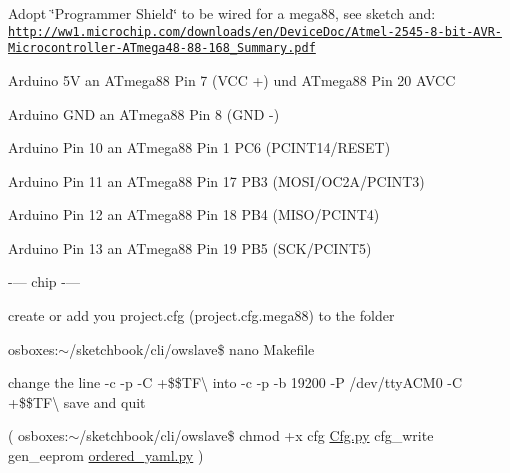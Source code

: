 Adopt \char`\"{}\-Programmer Shield\char`\"{} to be wired for a mega88, see sketch and\-: \href{http://ww1.microchip.com/downloads/en/DeviceDoc/Atmel-2545-8-bit-AVR-Microcontroller-ATmega48-88-168_Summary.pdf}{\tt http\-://ww1.\-microchip.\-com/downloads/en/\-Device\-Doc/\-Atmel-\/2545-\/8-\/bit-\/\-A\-V\-R-\/\-Microcontroller-\/\-A\-Tmega48-\/88-\/168\-\_\-\-Summary.\-pdf}


\begin{DoxyItemize}
\item Arduino 5\-V an A\-Tmega88 Pin 7 (V\-C\-C +) und A\-Tmega88 Pin 20 A\-V\-C\-C
\item Arduino G\-N\-D an A\-Tmega88 Pin 8 (G\-N\-D -\/)
\item Arduino Pin 10 an A\-Tmega88 Pin 1 P\-C6 (P\-C\-I\-N\-T14/\-R\-E\-S\-E\-T)
\item Arduino Pin 11 an A\-Tmega88 Pin 17 P\-B3 (M\-O\-S\-I/\-O\-C2\-A/\-P\-C\-I\-N\-T3)
\item Arduino Pin 12 an A\-Tmega88 Pin 18 P\-B4 (M\-I\-S\-O/\-P\-C\-I\-N\-T4)
\item Arduino Pin 13 an A\-Tmega88 Pin 19 P\-B5 (S\-C\-K/\-P\-C\-I\-N\-T5)
\end{DoxyItemize}

-\/--- chip -\/---

create or add you project.\-cfg (project.\-cfg.\-mega88) to the folder

osboxes\-:$\sim$/sketchbook/cli/owslave\$ nano Makefile

change the line  -\/c  -\/p  -\/\-C +\$\$\-T\-F\textbackslash{} into  -\/c  -\/p  -\/b 19200 -\/\-P /dev/tty\-A\-C\-M0 -\/\-C +\$\$\-T\-F\textbackslash{} save and quit

( osboxes\-:$\sim$/sketchbook/cli/owslave\$ chmod +x cfg \hyperlink{Cfg_8py}{Cfg.\-py} cfg\-\_\-write gen\-\_\-eeprom \hyperlink{ordered__yaml_8py}{ordered\-\_\-yaml.\-py} )


